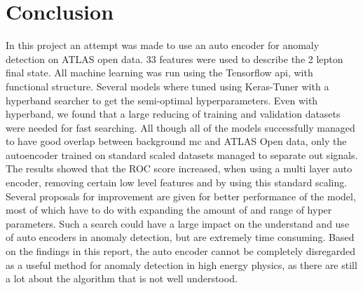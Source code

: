 \documentclass[ reprint, amsmath,amssymb, aps, nofootinbib]{revtex4-2}
\begin{document}
\section{Conclusion}

In this project an attempt was made to use an auto encoder for anomaly detection on ATLAS open data. 33 features were used to describe the 2 lepton final state. All machine learning was run using the Tensorflow api, with functional structure. Several models where tuned using Keras-Tuner with a hyperband searcher to get the semi-optimal hyperparameters. Even with hyperband, we found that a large reducing of training and validation datasets were needed for fast searching. All though all of the models successfully managed to have good overlap between background mc and ATLAS Open data, only the autoencoder trained on standard scaled datasets managed to separate out signals. The results showed that the ROC score increased, when using a multi layer auto encoder, removing certain low level features and by using this standard scaling. Several proposals for improvement are given for better performance of the model, most of which have to do with expanding the amount of and range of hyper parameters. Such a search could have a large impact on the understand and use of auto encoders in anomaly detection, but are extremely time consuming. Based on the findings in this report, the auto encoder cannot be completely disregarded as a useful method for anomaly detection in high energy physics, as there are still a lot about the algorithm that is not well understood. 



\mbox{~}
\onecolumngrid
\printbibliography

\newpage
\appendix
\end{document}
